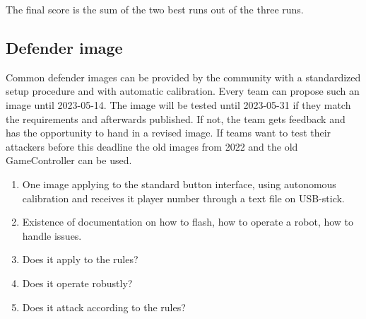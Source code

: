 The final score is the sum of the two best runs out of the three runs.

\subsection{Defender image}
\label{sec:Challenge_image}
Common defender images can be provided by the community with a standardized setup procedure and with automatic calibration. Every team can propose such an image until 2023-05-14. The image will be tested until 2023-05-31 if they match the requirements and afterwards published. If not, the team gets feedback and has the opportunity to hand in a revised image. If teams want to test their attackers before this deadline the old images from 2022 and the old GameController can be used.

\begin{enumerate}
	\item One image applying to the standard button interface, using autonomous calibration and receives it player number through a text file on USB-stick.
	\item Existence of documentation on how to flash, how to operate a robot, how to handle issues.
	\item Does it apply to the rules?
	\item Does it operate robustly?
	\item Does it attack according to the rules?
\end{enumerate}
